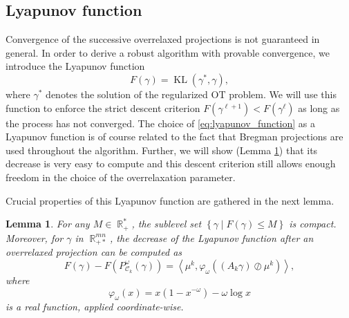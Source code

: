 \documentclass{article} %
\newcommand{\scal}[2]{\left\langle #1 , #2 \right\rangle}
\DeclareMathOperator{\IR}{\mathbb{R}}
\DeclareMathOperator{\Ccal}{\mathcal{C}}
\DeclareMathOperator{\KL}{KL}
\theoremstyle{plain}
\newtheorem{proposition}{Proposition}
\newtheorem{lemma}{Lemma}
\theoremstyle{definition}
\theoremstyle{remark}
\begin{document}
\subsection{Lyapunov function}
Convergence of the successive overrelaxed projections is not guaranteed in general. In order to derive a robust algorithm with provable convergence, we introduce the Lyapunov function 
\begin{equation}\label{eq:lyapunov_function}
F(\gamma) = \KL(\gamma^*, \gamma),
\end{equation}
where $\gamma^*$ denotes the solution of the regularized OT problem. We will use this function to enforce the strict descent criterion $F(\gamma^{\ell+1}) < F(\gamma^\ell)$ as long as the process has not converged.
%
The choice of \eqref{eq:lyapunov_function} as a Lyapunov function is of course related to the fact that Bregman projections are used throughout the algorithm. Further, we will show (Lemma \ref{lemma:lyapunov_decrease}) that its decrease is very easy to compute and this descent criterion still allows enough freedom in the choice of the overrelaxation parameter.

Crucial properties of this Lyapunov function are gathered in the next lemma.
\begin{lemma} \label{lemma:lyapunov_decrease}
	For any $M \in \IR_+^*$, the sublevel set $\left\{ \gamma \mid F(\gamma) \le M \right\}$ is compact.
	Moreover, for $\gamma$ in $\IR^{mn}_{+*}$, the decrease of the Lyapunov function after an overrelaxed projection can be computed as
	\begin{equation} \label{eq:kl_diff_scal}
	F(\gamma) - F(P^\omega_{\Ccal_k}(\gamma)) = 
	\scal{\mu^k}{\varphi_\omega \left((A_k \gamma) \oslash \mu^k \right)},
	\end{equation}
	where
	\begin{equation}
	\varphi_\omega(x) = x(1-x^{-\omega}) - \omega \log x
	\end{equation}
	is a real function, applied coordinate-wise.
\end{lemma}
\end{document}
